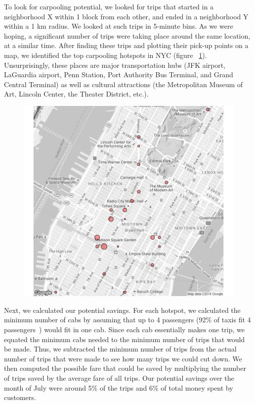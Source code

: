 \documentclass[twocolumn]{article}
\begin{document}
To look for carpooling potential, we looked for trips that started in a neighborhood X within 1 block from each other, and ended in a neighborhood Y within a 1 km radius. We looked at such trips in 5-minute bins. As we were hoping, a significant number of trips were taking place around the same location, at a similar time. After finding these trips and plotting their pick-up points on a map, we identified the top carpooling hotspots in NYC (figure ~\ref{fig:hotspots}). Unsurprisingly, these places are major transportation hubs (JFK airport, LaGuardia airport, Penn Station, Port Authority Bus Terminal, and Grand Central Terminal) as well as cultural attractions (the Metropolitan Museum of Art, Lincoln Center, the Theater District, etc.). 
\begin{figure}[h]
  \centering
  \includegraphics[width=.9\linewidth]{top_25_hotspots}
  \label{fig:hotspots}
\end{figure}

Next, we calculated our potential savings. For each hotspot, we calculated the minimum number of cabs by assuming that up to 4 passengers (92\% of taxis fit 4 passengers~\cite{TLC:2007}) would fit in one cab. Since each cab essentially makes one trip, we equated the minimum cabs needed to the minimum number of trips that would be made. Thus, we subtracted the minimum number of trips from the actual number of trips that were made to see how many trips we could cut down. We then computed the possible fare that could be saved by multiplying the number of trips saved by the average fare of all trips. Our potential savings over the month of July were around 5\% of the trips and 6\% of total money spent by customers.
\end{document}
